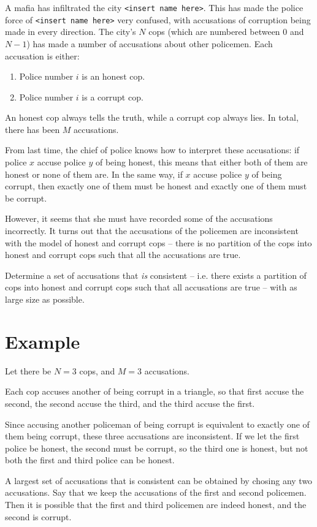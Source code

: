 \newcommand\version{v1}
A mafia has infiltrated the city \texttt{<insert name here>}.
This has made the police force of \texttt{<insert name here>} very confused, with accusations of corruption being made in every direction.
The city's $N$ cops (which are numbered between $0$ and $N - 1$) has made a number of accusations about other policemen.
Each accusation is either:
\begin{enumerate}
  \item Police number $i$ is an honest cop.
  \item Police number $i$ is a corrupt cop.
\end{enumerate}
An honest cop always tells the truth, while a corrupt cop always lies.
In total, there has been $M$ accusations.

From last time, the chief of police knows how to interpret these accusations: if police $x$ accuse police $y$ of being honest,
this means that either both of them are honest or none of them are. In the same way, if $x$ accuse police $y$ of being corrupt,
then exactly one of them must be honest and exactly one of them must be corrupt.

However, it seems that she must have recorded some of the accusations incorrectly. It turns out that the accusations of the 
policemen are inconsistent with the model of honest and corrupt cops -- there is no partition of the cops into honest
and corrupt cops such that all the accusations are true.

Determine a set of accusations that \emph{is} consistent -- i.e. there exists a partition of cops into honest and corrupt cops
such that all accusations are true -- with as large size as possible.

\section*{Example}
Let there be $N = 3$ cops, and $M = 3$ accusations.

Each cop accuses another of being corrupt in a triangle, so that first accuse the second, the second accuse the third, and the third
accuse the first.

Since accusing another policeman of being corrupt is equivalent to exactly one of them being corrupt, these three accusations
are inconsistent. If we let the first police be honest, the second must be corrupt, so the third one is honest, but not both
the first and third police can be honest.

A largest set of accusations that is consistent can be obtained by chosing any two accusations. Say that we keep the accusations
of the first and second policemen. Then it is possible that the first and third policemen are indeed honest, and the second
is corrupt.

